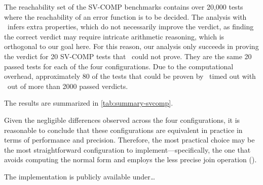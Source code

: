 The reachability set of the SV-COMP benchmarks contains over 20,000 tests where the reachability of an error function is to be decided.
The analysis with \cpo\ infers extra properties, which do not necessarily improve the verdict,
as finding the correct verdict may require intricate arithmetic reasoning, which is orthogonal to our goal here.
For this reason, our analysis only succeeds in proving the verdict for 20 SV-COMP tests that \base\ could not prove.
They are the same 20 passed tests for each of the four configurations.
Due to the computational overhead, approximately 80 of the tests that could be proven by \base\ timed out with \cpo\
out of more than 2000 passed verdicts.

The results are summarized in \cref{tab:summary-svcomp}.

Given the negligible differences observed across the four configurations, it is reasonable to conclude that these configurations are equivalent in practice in terms of performance and precision.
Therefore, the most practical choice may be the most straightforward configuration to implement---specifically, the one that avoids computing the normal form and employs the less precise join operation (\cpoq).

The implementation is publicly available under\dots {}
